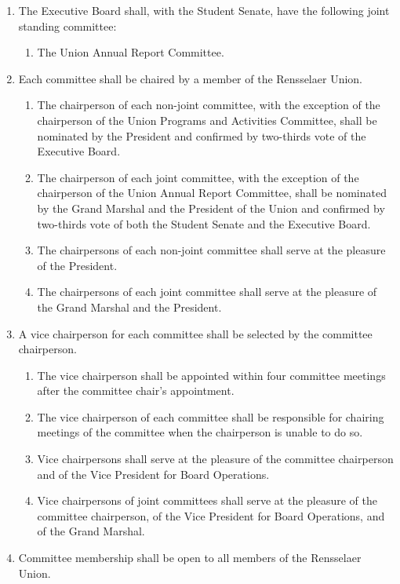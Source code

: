 \begin{enumerate}
\begin{enumerate}
  \end{enumerate}
\item The Executive Board shall, with the Student Senate, have the following joint standing committee:
  \begin{enumerate}
  \item The Union Annual Report Committee.
  \end{enumerate}
\item Each committee shall be chaired by a member of the Rensselaer Union.
  \begin{enumerate}
  \item The chairperson of each non-joint committee, with the exception of the chairperson of the Union Programs and Activities Committee, shall be nominated by the President and confirmed by two-thirds vote of the Executive Board.
  \item The chairperson of each joint committee, with the exception of the chairperson of the Union Annual Report Committee, shall be nominated by the Grand Marshal and the President of the Union and confirmed by two-thirds vote of both the Student Senate and the Executive Board.
  \item The chairpersons of each non-joint committee shall serve at the pleasure of the President.
  \item The chairpersons of each joint committee shall serve at the pleasure of the Grand Marshal and the President.
  \end{enumerate}
\item A vice chairperson for each committee shall be selected by the committee chairperson.
  \begin{enumerate}
  \item The vice chairperson shall be appointed within four committee meetings after the committee chair’s appointment.
  \item The vice chairperson of each committee shall be responsible for chairing meetings of the committee when the chairperson is unable to do so.
  \item Vice chairpersons shall serve at the pleasure of the committee chairperson and of the Vice President for Board Operations.
  \item Vice chairpersons of joint committees shall serve at the pleasure of the committee chairperson, of the Vice President for Board Operations, and of the Grand Marshal.
  \end{enumerate}
\item Committee membership shall be open to all members of the Rensselaer Union.

\end{enumerate}
